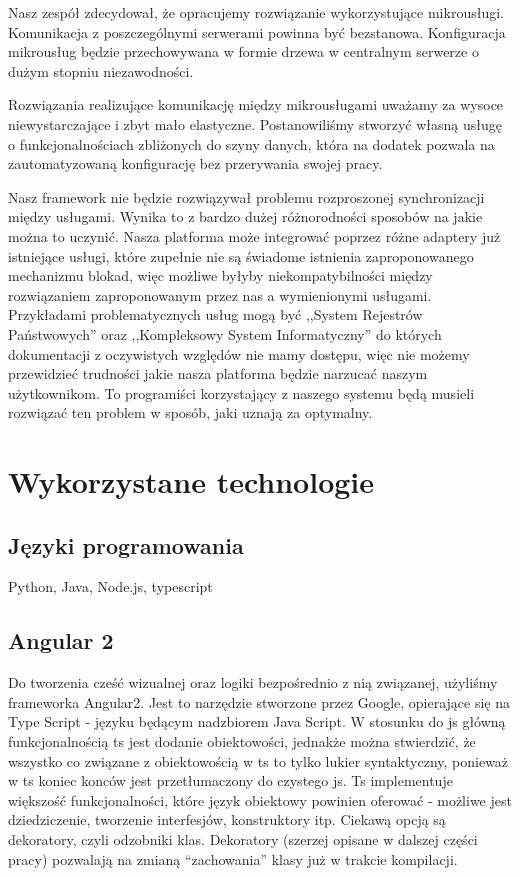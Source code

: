 \documentclass[licencjacka]{pracamgr}
\begin{document}
Nasz zespół zdecydował, że opracujemy rozwiązanie wykorzystujące mikrousługi.
Komunikacja z poszczególnymi serwerami powinna być bezstanowa. Konfiguracja
mikrousług będzie przechowywana w formie drzewa w centralnym serwerze o dużym
stopniu niezawodności.

Rozwiązania realizujące komunikację między mikrousługami uważamy za wysoce
niewystarczające i zbyt mało elastyczne. Postanowiliśmy stworzyć własną usługę
o funkcjonalnościach zbliżonych do szyny danych, która na dodatek pozwala na
zautomatyzowaną konfigurację bez przerywania swojej pracy.

Nasz framework nie będzie rozwiązywał problemu rozproszonej synchronizacji między
usługami. Wynika to z bardzo dużej różnorodności sposobów na jakie można to uczynić.
Nasza platforma może integrować poprzez różne adaptery już istniejące usługi,
które zupełnie nie są świadome istnienia zaproponowanego mechanizmu blokad,
więc możliwe byłyby niekompatybilności między rozwiązaniem zaproponowanym
przez nas a wymienionymi usługami. Przykładami problematycznych usług mogą być
,,System Rejestrów Państwowych'' oraz ,,Kompleksowy System Informatyczny'' do
których dokumentacji z oczywistych względów nie mamy dostępu, więc nie możemy
przewidzieć trudności jakie nasza platforma będzie narzucać naszym użytkownikom.
To programiści korzystający z naszego systemu będą musieli rozwiązać ten problem
w sposób, jaki uznają za optymalny.

\chapter{Wykorzystane technologie}

\section{Języki programowania}
Python, Java, Node.js, typescript

\section{Angular 2}

Do tworzenia cześć wizualnej oraz logiki bezpośrednio z nią związanej, użyliśmy frameworka Angular2. Jest to narzędzie stworzone przez Google, opierające się
na Type Script - języku będącym nadzbiorem Java Script. W stosunku do js główną funkcjonalnością ts jest dodanie obiektowości, jednakże można stwierdzić,
że wszystko co związane z obiektowością w ts to tylko lukier syntaktyczny, ponieważ w ts koniec konców jest przetłumaczony do czystego js. Ts implementuje większość
funkcjonalności, które język obiektowy powinien oferować - możliwe jest dziedziczenie, tworzenie interfesjów, konstruktory itp. Ciekawą opcją są dekoratory, czyli
odzobniki klas. Dekoratory (szerzej opisane w dalszej części pracy) pozwalają na zmianą ``zachowania'' klasy już w trakcie kompilacji.
\end{document}
